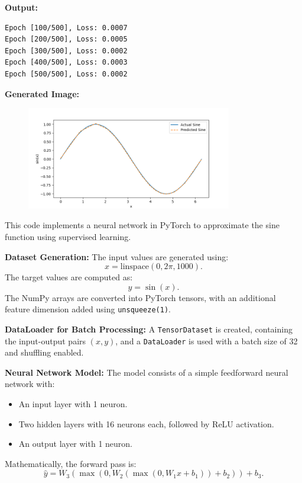 \textbf{Output:}
\begin{lstlisting}
Epoch [100/500], Loss: 0.0007
Epoch [200/500], Loss: 0.0005
Epoch [300/500], Loss: 0.0002
Epoch [400/500], Loss: 0.0003
Epoch [500/500], Loss: 0.0002
\end{lstlisting}
%

\textbf{Generated Image:}
\begin{figure}[ht] \centering
\includegraphics[width=0.8\textwidth]{images/code-ch04-sec03-sine_approximation.png}
\end{figure}

This code implements a neural network in PyTorch to approximate the sine function using supervised learning.

\textbf{Dataset Generation:}  
The input values are generated using:
\begin{equation}
    x = \text{linspace}(0, 2\pi, 1000).
\end{equation}
The target values are computed as:
\begin{equation}
    y = \sin(x).
\end{equation}
The NumPy arrays are converted into PyTorch tensors, with an additional feature dimension added using \texttt{unsqueeze(1)}.

\textbf{DataLoader for Batch Processing:}  
A \texttt{TensorDataset} is created, containing the input-output pairs $(x, y)$, and a \texttt{DataLoader} is used with a batch size of 32 and shuffling enabled.

\textbf{Neural Network Model:}  
The model consists of a simple feedforward neural network with:
\begin{itemize}
    \item An input layer with 1 neuron.
    \item Two hidden layers with 16 neurons each, followed by ReLU activation.
    \item An output layer with 1 neuron.
\end{itemize}
Mathematically, the forward pass is:
\begin{equation}
    \hat{y} = W_3 (\max(0, W_2 (\max(0, W_1 x + b_1)) + b_2)) + b_3.
\end{equation}

